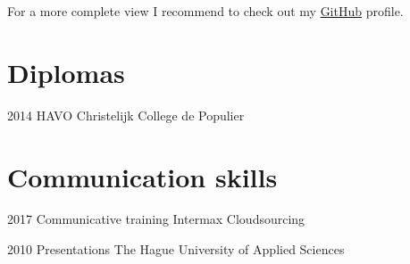 \documentclass[]{friggeri-cv}
\begin{document}
For a more complete view I recommend to check out my
\href{https://github.com/timvisee}{GitHub}
profile.


\section{Diplomas}

\begin{entrylist}


\entry
{2014}
{HAVO}
{Christelijk College de Populier}


\end{entrylist}


\section{Communication skills}

\begin{entrylist}


\entry
{2017}
{Communicative training}
{Intermax Cloudsourcing}


\entry
{2010}
{Presentations}
{The Hague University of Applied Sciences}


\end{entrylist}

\end{document}
